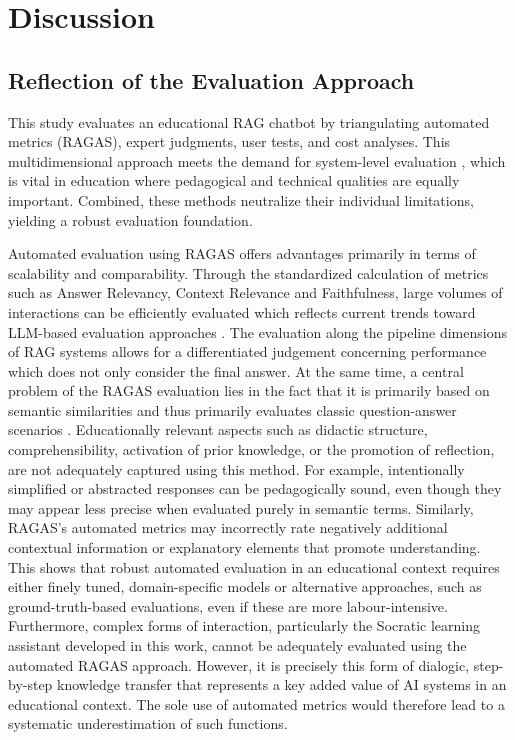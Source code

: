 \section{Discussion}
\subsection{Reflection of the Evaluation Approach}

This study evaluates an educational RAG chatbot by triangulating automated metrics (RAGAS), expert judgments, user tests, and cost analyses. This multidimensional approach meets the demand for system-level evaluation \autocite{Yu2024RAGEvalSurvey,bdcc9120320}, which is vital in education where pedagogical and technical qualities are equally important. Combined, these methods neutralize their individual limitations, yielding a robust evaluation foundation.

Automated evaluation using RAGAS offers advantages primarily in terms of scalability and comparability. Through the standardized calculation of metrics such as Answer Relevancy, Context Relevance and Faithfulness, large volumes of interactions can be efficiently evaluated which reflects current trends toward LLM-based evaluation approaches \autocite{es2025ragas,saadfalcon2024ares,CRUDRAG}. The evaluation along the pipeline dimensions of RAG systems allows for a differentiated judgement concerning performance which does not only consider the final answer. At the same time, a central problem of the RAGAS evaluation lies in the fact that it is primarily based on semantic similarities and thus primarily evaluates classic question-answer scenarios \autocite{Lewis2020_RAG}. Educationally relevant aspects such as didactic structure, comprehensibility, activation of prior knowledge, or the promotion of reflection, are not adequately captured using this method. For example, intentionally simplified or abstracted responses can be pedagogically sound, even though they may appear less precise when evaluated purely in semantic terms. Similarly, RAGAS's automated metrics may incorrectly rate negatively additional contextual information or explanatory elements that promote understanding. This shows that robust automated evaluation in an educational context requires either finely tuned, domain-specific models or alternative approaches, such as ground-truth-based evaluations, even if these are more labour-intensive.
Furthermore, complex forms of interaction, particularly the Socratic learning assistant developed in this work, cannot be adequately evaluated using the automated RAGAS approach. However, it is precisely this form of dialogic, step-by-step knowledge transfer that represents a key added value of AI systems in an educational context. The sole use of automated metrics would therefore lead to a systematic underestimation of such functions.

